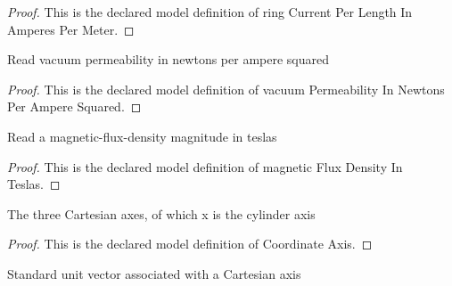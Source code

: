 \begin{proof}
  This is the declared model definition of ring Current Per Length In Amperes Per Meter.
\end{proof}
\begin{definition}
  \label{def:physics:phyx-mini-0969:phyxminiproblems-problemphyxmini0969-vacuumpermeabilityinnewtonsperamperesquared}
  Read vacuum permeability in newtons per ampere squared
\end{definition}
\begin{proof}
  This is the declared model definition of vacuum Permeability In Newtons Per Ampere Squared.
\end{proof}
\begin{definition}
  \label{def:physics:phyx-mini-0969:phyxminiproblems-problemphyxmini0969-magneticfluxdensityinteslas}
  Read a magnetic-flux-density magnitude in teslas
\end{definition}
\begin{proof}
  This is the declared model definition of magnetic Flux Density In Teslas.
\end{proof}
\begin{definition}
  \label{def:physics:phyx-mini-0969:phyxminiproblems-problemphyxmini0969-coordinateaxis}
  The three Cartesian axes, of which x is the cylinder axis
\end{definition}
\begin{proof}
  This is the declared model definition of Coordinate Axis.
\end{proof}
\begin{definition}
  \label{def:physics:phyx-mini-0969:phyxminiproblems-problemphyxmini0969-axisvector}
  Standard unit vector associated with a Cartesian axis
\end{definition}
